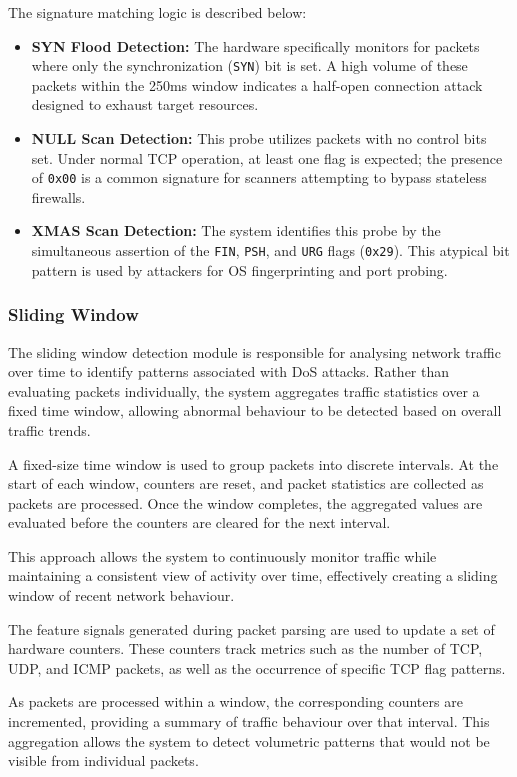 The signature matching logic is described below:
\begin{itemize}
    \item \textbf{SYN Flood Detection:} The hardware specifically monitors for packets where only the synchronization (\texttt{SYN}) bit is set. A high volume of these packets within the 250ms window indicates a half-open connection attack designed to exhaust target resources.
    \item \textbf{NULL Scan Detection:} This probe utilizes packets with no control bits set. Under normal TCP operation, at least one flag is expected; the presence of \texttt{0x00} is a common signature for scanners attempting to bypass stateless firewalls.
    \item \textbf{XMAS Scan Detection:} The system identifies this probe by the simultaneous assertion of the \texttt{FIN}, \texttt{PSH}, and \texttt{URG} flags (\texttt{0x29}). This atypical bit pattern is used by attackers for OS fingerprinting and port probing.
\end{itemize}


\subsubsection{Sliding Window}
The sliding window detection module is responsible for analysing network
traffic over time to identify patterns associated with DoS attacks. Rather than
evaluating packets individually, the system aggregates traffic statistics over
a fixed time window, allowing abnormal behaviour to be detected based on
overall traffic trends.

A fixed-size time window is used to group packets into discrete intervals. At
the start of each window, counters are reset, and packet statistics are
collected as packets are processed. Once the window completes, the aggregated
values are evaluated before the counters are cleared for the next interval.

This approach allows the system to continuously monitor traffic while
maintaining a consistent view of activity over time, effectively creating a
sliding window of recent network behaviour.


The feature signals generated during packet parsing are used to update a set of
hardware counters. These counters track metrics such as the number of TCP, UDP,
and ICMP packets, as well as the occurrence of specific TCP flag patterns.

As packets are processed within a window, the corresponding counters are
incremented, providing a summary of traffic behaviour over that interval. This
aggregation allows the system to detect volumetric patterns that would not be
visible from individual packets.

